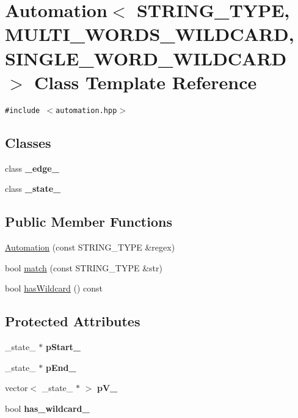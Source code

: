 \hypertarget{classAutomation}{
\section{Automation$<$ STRING\_\-TYPE, MULTI\_\-WORDS\_\-WILDCARD, SINGLE\_\-WORD\_\-WILDCARD $>$ Class Template Reference}
\label{classAutomation}
}
{\tt \#include $<$automation.hpp$>$}

\subsection*{Classes}
\begin{CompactItemize}
\item 
class \textbf{\_\-edge\_\-}
\item 
class \textbf{\_\-state\_\-}
\end{CompactItemize}
\subsection*{Public Member Functions}
\begin{CompactItemize}
\item 
\hyperlink{classAutomation_eab5e3b7894377708216a3f4f2573a16}{Automation} (const STRING\_\-TYPE \&regex)
\item 
bool \hyperlink{classAutomation_b2f969eb8050ed62b16eba9d3e8ffaf6}{match} (const STRING\_\-TYPE \&str)
\item 
bool \hyperlink{classAutomation_520bbf0d1765ec51131897bad7579005}{hasWildcard} () const 
\end{CompactItemize}
\subsection*{Protected Attributes}
\begin{CompactItemize}
\item 
\hypertarget{classAutomation_3c6c8988c57d1221096921356d7e83eb}{
\_\-state\_\- $\ast$ \textbf{pStart\_\-}}
\label{classAutomation_3c6c8988c57d1221096921356d7e83eb}

\item 
\hypertarget{classAutomation_516783fe1c5111b6d1c6060904c26c39}{
\_\-state\_\- $\ast$ \textbf{pEnd\_\-}}
\label{classAutomation_516783fe1c5111b6d1c6060904c26c39}

\item 
\hypertarget{classAutomation_190d97f4456e688b8fec4b34779c8ff1}{
vector$<$ \_\-state\_\- $\ast$ $>$ \textbf{pV\_\-}}
\label{classAutomation_190d97f4456e688b8fec4b34779c8ff1}

\item 
\hypertarget{classAutomation_5c14e7bcdebf33094482aca10bc0ae73}{
bool \textbf{has\_\-wildcard\_\-}}
\label{classAutomation_5c14e7bcdebf33094482aca10bc0ae73}

\end{CompactItemize}
